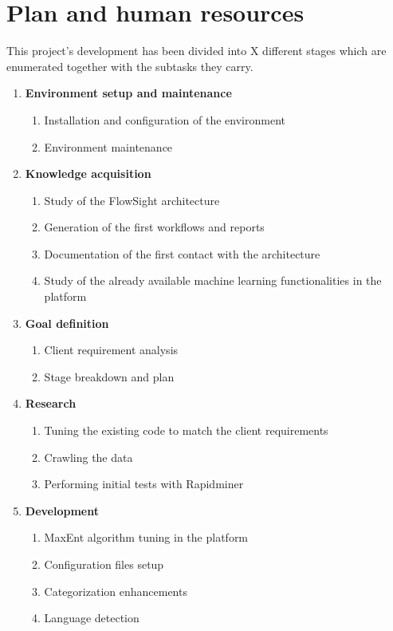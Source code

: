 \section{Plan and human resources}
This project's development has been divided into X different stages which are enumerated together with the subtasks they carry.
\begin{enumerate}
  \item \textbf{Environment setup and maintenance}
  \begin{enumerate}
    \item Installation and configuration of the environment
    \item Environment maintenance
  \end{enumerate}
  \item \textbf{Knowledge acquisition}
  \begin{enumerate}
    \item Study of the FlowSight architecture
    \item Generation of the first workflows and reports
    \item Documentation of the first contact with the architecture
    \item Study of the already available machine learning functionalities in the platform
  \end{enumerate}
  \item \textbf{Goal definition}
  \begin{enumerate}
    \item Client requirement analysis   
    \item Stage breakdown and plan
  \end{enumerate}
  \item \textbf{Research}
  \begin{enumerate}
    \item Tuning the existing code to match the client requirements
    \item Crawling the data
    \item Performing initial tests with Rapidminer
  \end{enumerate}
  \item \textbf{Development}
  \begin{enumerate}
    \item MaxEnt algorithm tuning in the platform
    \item Configuration files setup
    \item Categorization enhancements
    \item Language detection

\end{enumerate}
\end{enumerate}
